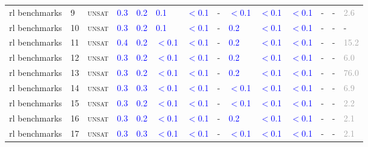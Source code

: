 \begin{center}
{\begin{longtable}{@{}llllllllllllll@{}}
rl benchmarks & 9 & \textsc{unsat} & \textcolor{blue}{0.3} & \textcolor{blue}{0.2} & \textcolor{blue}{0.1} & \textcolor{blue}{$<$0.1} & - & \textcolor{blue}{$<$0.1} & \textcolor{blue}{$<$0.1} & \textcolor{blue}{$<$0.1} & - & - & \textcolor{darkgray}{2.6} \\
rl benchmarks & 10 & \textsc{unsat} & \textcolor{blue}{0.3} & \textcolor{blue}{0.2} & \textcolor{blue}{0.1} & \textcolor{blue}{$<$0.1} & - & \textcolor{blue}{0.2} & \textcolor{blue}{$<$0.1} & \textcolor{blue}{$<$0.1} & - & - & - \\
rl benchmarks & 11 & \textsc{unsat} & \textcolor{blue}{0.4} & \textcolor{blue}{0.2} & \textcolor{blue}{$<$0.1} & \textcolor{blue}{$<$0.1} & - & \textcolor{blue}{0.2} & \textcolor{blue}{$<$0.1} & \textcolor{blue}{$<$0.1} & - & - & \textcolor{darkgray}{15.2} \\
rl benchmarks & 12 & \textsc{unsat} & \textcolor{blue}{0.3} & \textcolor{blue}{0.2} & \textcolor{blue}{$<$0.1} & \textcolor{blue}{$<$0.1} & - & \textcolor{blue}{0.2} & \textcolor{blue}{$<$0.1} & \textcolor{blue}{$<$0.1} & - & - & \textcolor{darkgray}{6.0} \\
rl benchmarks & 13 & \textsc{unsat} & \textcolor{blue}{0.3} & \textcolor{blue}{0.2} & \textcolor{blue}{$<$0.1} & \textcolor{blue}{$<$0.1} & - & \textcolor{blue}{0.2} & \textcolor{blue}{$<$0.1} & \textcolor{blue}{$<$0.1} & - & - & \textcolor{darkgray}{76.0} \\
rl benchmarks & 14 & \textsc{unsat} & \textcolor{blue}{0.3} & \textcolor{blue}{0.3} & \textcolor{blue}{$<$0.1} & \textcolor{blue}{$<$0.1} & - & \textcolor{blue}{$<$0.1} & \textcolor{blue}{$<$0.1} & \textcolor{blue}{$<$0.1} & - & - & \textcolor{darkgray}{6.9} \\
rl benchmarks & 15 & \textsc{unsat} & \textcolor{blue}{0.3} & \textcolor{blue}{0.2} & \textcolor{blue}{$<$0.1} & \textcolor{blue}{$<$0.1} & - & \textcolor{blue}{$<$0.1} & \textcolor{blue}{$<$0.1} & \textcolor{blue}{$<$0.1} & - & - & \textcolor{darkgray}{2.2} \\
rl benchmarks & 16 & \textsc{unsat} & \textcolor{blue}{0.3} & \textcolor{blue}{0.2} & \textcolor{blue}{$<$0.1} & \textcolor{blue}{$<$0.1} & - & \textcolor{blue}{0.2} & \textcolor{blue}{$<$0.1} & \textcolor{blue}{$<$0.1} & - & - & \textcolor{darkgray}{2.1} \\
rl benchmarks & 17 & \textsc{unsat} & \textcolor{blue}{0.3} & \textcolor{blue}{0.3} & \textcolor{blue}{$<$0.1} & \textcolor{blue}{$<$0.1} & - & \textcolor{blue}{$<$0.1} & \textcolor{blue}{$<$0.1} & \textcolor{blue}{$<$0.1} & - & - & \textcolor{darkgray}{2.1} \\

\end{longtable}}
\end{center}
